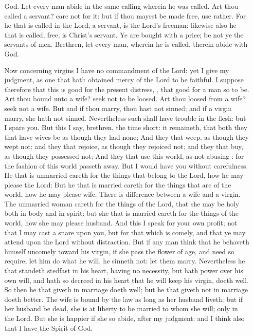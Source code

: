 {God.
Let every
man
abide
in the
same
calling
wherein he was
called.
Art thou
called
{} a
servant?
care
not for
it:
but
if thou
mayest be
made
free,
use
{}
rather.
For he
that is
called
in the
Lord,
{} a
servant,
is the
Lord’s
freeman:
likewise
also he
that is
called,
{}
free,
is
Christ’s
servant.
Ye are
bought with a
price;
be
not
ye the
servants of
men.
Brethren, let every
man,
wherein he is
called,
therein
abide
with
God.
\par }{\PP {}Now
concerning
virgins I
have
no
commandment of the
Lord:
yet I
give my
judgment,
as one that hath obtained
mercy
of the
Lord to
be
faithful.
I
suppose
therefore that
this
is
good
for the
present
distress,
{},
that
{}
good for a
man
so to
be.
Art thou
bound unto a
wife?
seek
not to be
loosed. Art thou
loosed
from a
wife?
seek
not a
wife.
But
and
if thou
marry, thou
hast
not
sinned;
and
if a
virgin
marry, she
hath
not
sinned.
Nevertheless
such shall
have
trouble in the
flesh:
but
I
spare
you.
But
this I
say,
brethren, the
time
{}
short: it
remaineth,
that
both they
that
have
wives be
as
though they
had
none;
And
they that
weep, as
though they
wept
not;
and
they that
rejoice, as
though they
rejoiced
not;
and
they that
buy, as
though they
possessed
not;
And
they that
use
this
world,
as
not
abusing
{}:
for the
fashion of
this
world passeth
away.
But I would
have
you without
carefulness.
He that
is
unmarried careth
for the
things that belong to the
Lord,
how he may
please the
Lord:
But
he that is
married careth
for the
things that are of the
world,
how he may
please
{}
wife.
There is
difference
{}
between a
wife
and a
virgin. The
unmarried woman careth
for the
things of the
Lord,
that she may
be
holy
both in
body
and in
spirit:
but
she that is
married careth
for the
things of the
world,
how she may
please
{}
husband.
And
this I
speak
for
your
own
profit;
not
that I may
cast a
snare upon
you,
but
for that which is
comely,
and that ye may attend
upon the
Lord without
distraction.
But
if any
man
think
that he
behaveth
himself
uncomely
toward his
virgin,
if she
pass the flower
of
{}
age,
and
need
so
require, let him
do what he
will, he
sinneth
not: let them
marry.
Nevertheless he
that
standeth
stedfast
in his
heart,
having
no
necessity,
but
hath
power
over his
own
will,
and
hath
so
decreed
in
his
heart that he will
keep
his
virgin,
doeth
well.
So
then
he that
giveth
{} in
marriage
doeth
well;
but
he that
giveth
{}
not in
marriage
doeth
better.
The
wife is
bound by the
law
as
long
as
her
husband
liveth;
but
if
her
husband be
dead, she
is at
liberty to be married
to
whom she
will;
only
in the
Lord.
But she
is
happier
if
she
so
abide,
after
my
judgment:
and
I
think
also that I
have the
Spirit of
God.

}
